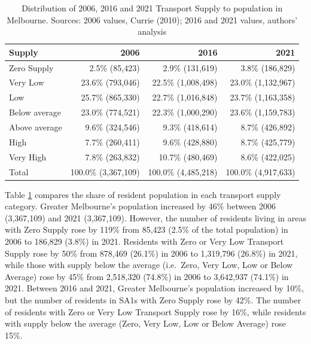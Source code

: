 \documentclass[preprint, 3p,
authoryear]{elsarticle} %
\begin{document}
\begin{table}

\caption{\label{tab:Greater_Melbourne_CCDs_SA1_population}Distribution of 2006, 2016 and 2021 Transport Supply to population in Melbourne. Sources: 2006 values, Currie (2010); 2016 and 2021 values, authors' analysis}
\centering
\begin{tabular}[t]{l|r|r|r}
\hline
Supply & 2006 & 2016 & 2021\\
\hline
Zero Supply & 2.5\%    (85,423) & 2.9\%   (131,619) & 3.8\%   (186,829)\\
\hline
Very Low & 23.6\%   (793,046) & 22.5\% (1,008,498) & 23.0\% (1,132,967)\\
\hline
Low & 25.7\%   (865,330) & 22.7\% (1,016,848) & 23.7\% (1,163,358)\\
\hline
Below average & 23.0\%   (774,521) & 22.3\% (1,000,290) & 23.6\% (1,159,783)\\
\hline
Above average & 9.6\%   (324,546) & 9.3\%   (418,614) & 8.7\%   (426,892)\\
\hline
High & 7.7\%   (260,411) & 9.6\%   (428,880) & 8.7\%   (425,779)\\
\hline
Very High & 7.8\%   (263,832) & 10.7\%   (480,469) & 8.6\%   (422,025)\\
\hline
Total & 100.0\% (3,367,109) & 100.0\% (4,485,218) & 100.0\% (4,917,633)\\
\hline
\end{tabular}
\end{table}

Table \ref{tab:Greater_Melbourne_CCDs_SA1_population} compares the share
of resident population in each transport supply category. Greater
Melbourne's population increased by 46\% between 2006 (3,367,109) and
2021 (3,367,109). However, the number of residents living in areas with
Zero Supply rose by 119\% from 85,423 (2.5\% of the total population) in
2006 to 186,829 (3.8\%) in 2021. Residents with Zero or Very Low
Transport Supply rose by 50\% from 878,469 (26.1\%) in 2006 to 1,319,796
(26.8\%) in 2021, while those with supply below the average (i.e.~Zero,
Very Low, Low or Below Average) rose by 45\% from 2,518,320 (74.8\%) in
2006 to 3,642,937 (74.1\%) in 2021. Between 2016 and 2021, Greater
Melbourne's population increased by 10\%, but the number of residents in
SA1s with Zero Supply rose by 42\%. The number of residents with Zero or
Very Low Transport Supply rose by 16\%, while residents with supply
below the average (Zero, Very Low, Low or Below Average) rose 15\%.
\end{document}
